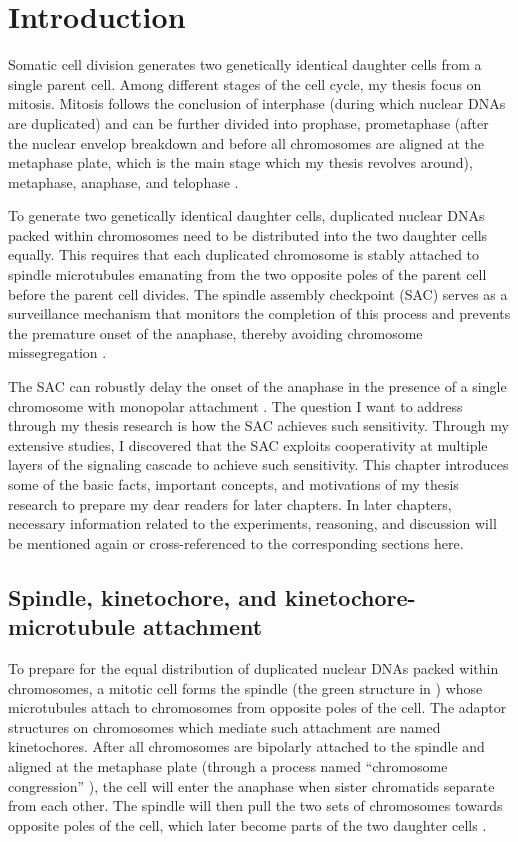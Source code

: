 \chapter{Introduction}
\label{chpt:introduction}

Somatic cell division generates two genetically identical daughter cells from a single parent cell. Among different stages of the cell cycle, my thesis focus on mitosis. Mitosis follows the conclusion of interphase (during which nuclear DNAs are duplicated) and can be further divided into prophase, prometaphase (after the nuclear envelop breakdown and before all chromosomes are aligned at the metaphase plate, which is the main stage which my thesis revolves around), metaphase, anaphase, and telophase \cite{MBC4}.

To generate two genetically identical daughter cells, duplicated nuclear DNAs packed within chromosomes need to be distributed into the two daughter cells equally. This requires that each duplicated chromosome is stably attached to spindle microtubules emanating from the two opposite poles of the parent cell before the parent cell divides. The spindle assembly checkpoint (SAC) serves as a surveillance mechanism that monitors the completion of this process and prevents the premature onset of the anaphase, thereby avoiding chromosome missegregation \cite{MBC4}.

The SAC can robustly delay the onset of the anaphase in the presence of a single chromosome with monopolar attachment \cite{PtK1SingleUnattachedKT}. The question I want to address through my thesis research is how the SAC achieves such sensitivity. Through my extensive studies, I discovered that the SAC exploits cooperativity at multiple layers of the signaling cascade to achieve such sensitivity. This chapter introduces some of the basic facts, important concepts, and motivations of my thesis research to prepare my dear readers for later chapters. In later chapters, necessary information related to the experiments, reasoning, and discussion will be mentioned again or cross-referenced to the corresponding sections here.

\section{Spindle, kinetochore, and kinetochore-microtubule attachment}

To prepare for the equal distribution of duplicated nuclear DNAs packed within chromosomes, a mitotic cell forms the spindle (the green structure in ) whose microtubules attach to chromosomes from opposite poles of the cell. The adaptor structures on chromosomes which mediate such attachment are named kinetochores. After all chromosomes are bipolarly attached to the spindle and aligned at the metaphase plate (through a process named ``chromosome congression'' \cite{ChromosomeCongression}), the cell will enter the anaphase when sister chromatids separate from each other. The spindle will then pull the two sets of chromosomes towards opposite poles of the cell, which later become parts of the two daughter cells \cite{MBC4}.

